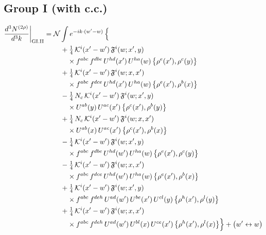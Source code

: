 \documentclass[10pt]{article}
\numberwithin{equation}{section}
\newcommand{\KK}{\mathcal K}
\newcommand{\NN}{\mathcal N}
\begin{document}
\subsection*{Group I (with c.c.)}
\begin{align}
\frac{d^3N^{(2\rho)}}{d^3k}\bigg|_{\rm GI.II}={}&\NN\int e^{-ik\cdot(w'-w)}\,\Big\{\notag\\
&\quad +\tfrac14\,\KK^{i}(x'-w')\,\mathfrak F^{i}(w;x',y)\notag\\
&\qquad\times f^{abc}\,f^{dbe}\,U^{hd}(x')\,U^{ha}(w)\,\big\{\rho^{e}(x'),\rho^{c}(y)\big\}\notag\\
&\quad +\tfrac14\,\KK^{i}(x'-w')\,\mathfrak F^{i}(w;x,x')\notag\\
&\qquad\times f^{abc}\,f^{dce}\,U^{hd}(x')\,U^{ha}(w)\,\big\{\rho^{e}(x'),\rho^{b}(x)\big\}\notag\\
&\quad -\tfrac14\,N_{c}\,\KK^{i}(x'-w')\,\mathfrak F^{i}(w;x',y)\notag\\
&\qquad\times U^{ab}(y)\,U^{ac}(x')\,\big\{\rho^{c}(x'),\rho^{b}(y)\big\}\notag\\
&\quad +\tfrac14\,N_{c}\,\KK^{i}(x'-w')\,\mathfrak F^{i}(w;x,x')\notag\\
&\qquad\times U^{ab}(x)\,U^{ac}(x')\,\big\{\rho^{c}(x'),\rho^{b}(x)\big\}\notag\\
&\quad -\tfrac14\,\KK^{i}(x'-w')\,\mathfrak F^{i}(w;x',y)\notag\\
&\qquad\times f^{abc}\,f^{dbe}\,U^{hd}(w')\,U^{ha}(w)\,\big\{\rho^{e}(x'),\rho^{c}(y)\big\}\notag\\
&\quad -\tfrac14\,\KK^{i}(x'-w')\,\mathfrak F^{i}(w;x,x')\notag\\
&\qquad\times f^{abc}\,f^{dce}\,U^{hd}(w')\,U^{ha}(w)\,\big\{\rho^{e}(x'),\rho^{b}(x)\big\}\notag\\
&\quad +\tfrac14\,\KK^{i}(x'-w')\,\mathfrak F^{i}(w;x',y)\notag\\
&\qquad\times f^{abc}\,f^{deh}\,U^{ad}(w')\,U^{be}(x')\,U^{cl}(y)\,\big\{\rho^{h}(x'),\rho^{l}(y)\big\}\notag\\
&\quad +\tfrac14\,\KK^{i}(x'-w')\,\mathfrak F^{i}(w;x,x')\notag\\
&\qquad\times f^{abc}\,f^{deh}\,U^{ad}(w')\,U^{bl}(x)\,U^{ce}(x')\,\big\{\rho^{h}(x'),\rho^{l}(x)\big\}\Big\}+\big(w'\leftrightarrow w\big)\label{eq:sum-GI.II}
\end{align}
\end{document}
